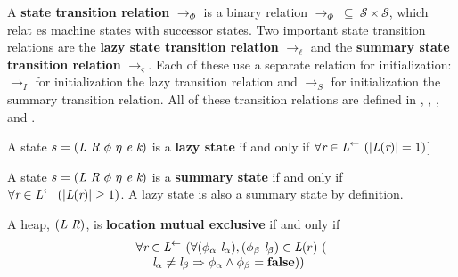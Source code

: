 \begin{definition}
A \textbf{state transition relation} $\rightarrow_{\Phi}$ is a binary relation $\rightarrow_{\Phi}\ \subseteq\ \mathcal{S} \times \mathcal{S} $, which relat
es machine states with successor states. Two important state transition relations are the \textbf{lazy state transition relation} $\rightarrow_\ell$ and the \textbf{summary state transition relation} $\rightarrow_\varsigma$. Each of these use a separate relation for initialization: $\rightarrow_I$ for initialization the lazy transition relation and $\rightarrow_S$ for initialization the summary transition relation. All of these transition relations are defined in , , , and .
\end{definition}

\begin{definition}
A state $s = (\cfgnt{L}\ \cfgnt{R}\ \phi\ \eta\ \cfgnt{e}\ \cfgnt{k})$ is a \textbf{lazy state} if and only if $\forall \emph{r} \in \emph{L}^\leftarrow\ (|\emph{L}(\emph{r})| = 1)$]
\end{definition}

\begin{definition}
A state $s = (\cfgnt{L}\ \cfgnt{R}\ \phi\ \eta\ \cfgnt{e}\ \cfgnt{k})$ is a \textbf{summary state} if and only if 
$\forall \emph{r} \in \emph{L}^\leftarrow\ (|\emph{L}(\emph{r})| \ge 1)$.
A lazy state is also a summary state by definition.
\end{definition}

\begin{definition}
A heap, $(\emph{L}\ \emph{R})$, is \textbf{location mutual exclusive} if and only if 
\[
\begin{array}{l}
\forall \cfgnt{r} \in \cfgnt{L}^\leftarrow\ (\forall (\phi_\alpha\ \cfgnt{l}_\alpha),(\phi_\beta\ \cfgnt{l}_\beta) \in \cfgnt{L}(r)\ (\\
\ \ \ \ \cfgnt{l}_\alpha \neq \cfgnt{l}_\beta \Rightarrow \phi_\alpha \wedge \phi_\beta = \cfgt{false}))
\end{array}
\]
\end{definition}
%

